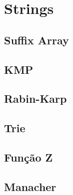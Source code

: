 \section{Strings}

\subsection{Suffix Array}


\subsection{KMP}


% 

% 

\subsection{Rabin-Karp}


\subsection{Trie}


\subsection{Função Z}


% 

\subsection{Manacher}


% 

